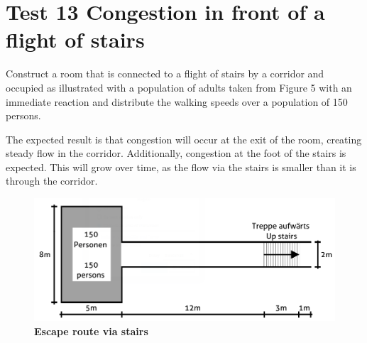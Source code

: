 \section*{Test 13  Congestion in front of a flight of stairs}

Construct a room that is connected to a flight of stairs by a corridor and occupied as illustrated with a population of adults taken from Figure 5 with an immediate reaction and distribute the walking speeds over a population of 150 persons.

\noindent
The expected result is that congestion will occur at the exit of the room, creating steady flow in the corridor. Additionally, congestion at the foot of the stairs is expected. This will grow over time, as the flow via the stairs is smaller than it is through the corridor.


\begin{figure}[h]
	\centering
	\includegraphics[scale=0.44]{test_description/Escape_route_test_13.png}
	\caption{\footnotesize \textbf{Escape route via stairs
}}
\end{figure}

